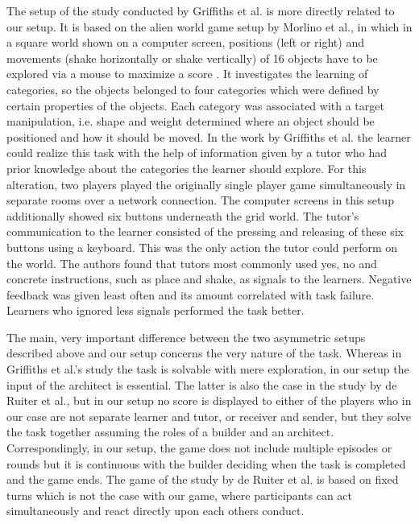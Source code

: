 The setup of the study conducted by Griffiths et al. \cite{griffiths2012bottom} is more directly related to our setup. 
It is based on the alien world game setup by Morlino et al., in which in a square world shown on a computer screen, positions (left or right) and movements (shake horizontally or shake vertically) of 16 objects have to be explored via a mouse to maximize a score \cite{morlino2010developing}. It investigates the learning of categories, so the objects belonged to four categories which were defined by certain properties of the objects. Each category was associated with a target manipulation, i.e. shape and weight determined where an object should be positioned and how it should be moved. In the work by Griffiths et al. the learner could realize this task with the help of information given by a tutor who had prior knowledge about the categories the learner should explore. For this alteration, two players played the originally single player game simultaneously in separate rooms over a network connection. The computer screens in this setup additionally showed six buttons underneath the grid world. The tutor's communication to the learner consisted of the pressing and releasing of these six buttons using a keyboard. This was the only action the tutor could perform on the world.
The authors found that tutors most commonly used yes, no and concrete instructions, such as place and shake, as signals to the learners. Negative feedback was given least often and its amount correlated with task failure. Learners who ignored less signals performed the task better.

The main, very important difference between the two asymmetric setups described above and our setup concerns the very nature of the task. Whereas in Griffiths et al.'s study the task is solvable with mere exploration, in our setup the input of the architect is essential. The latter is also the case in the study by de Ruiter et al., but in our setup no score is displayed to either of the players who in our case are not separate learner and tutor, or receiver and sender, but they solve the task together assuming the roles of a builder and an architect. Correspondingly, in our setup, the game does not include multiple episodes or rounds but it is continuous with the builder deciding when the task is completed and the game ends. The game of the study by de Ruiter et al. is based on fixed turns which is not the case with our game, where participants can act simultaneously and react directly upon each others conduct.

